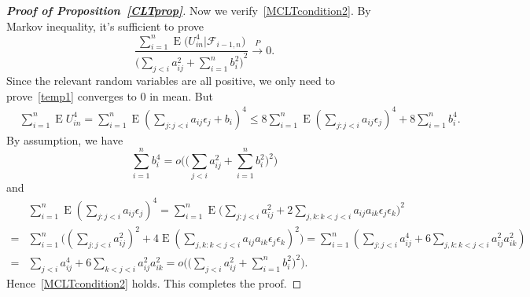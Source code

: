 \documentclass[3p]{elsarticle}
\DeclareMathOperator{\myE}{E}
\theoremstyle{plain}
\theoremstyle{definition}
\theoremstyle{remark}
\begin{document}
\begin{proof}[\textbf{Proof of Proposition~\ref{CLTprop}}]
     Now we verify~\eqref{MCLTcondition2}.
     By Markov inequality, it's sufficient to prove
     \begin{equation}\label{temp1}
         \frac{\sum_{i=1}^n \myE\big(U_{in}^4\big|\mathcal{F}_{i-1,n}\big)}{{\big(\sum_{j<i} a_{ij}^2+\sum_{i=1}^n b_i^2\big)}^2}\xrightarrow{P} 0.
     \end{equation}
     Since the relevant random variables are all positive, we only need to prove~\eqref{temp1} converges to $0$ in mean. But
     \begin{equation*}
         \begin{aligned}
             &\sum_{i=1}^n \myE U_{in}^4
             =
             \sum_{i=1}^n \myE (\sum_{j:j<i}a_{ij}\epsilon_j+b_i)^4
             \leq
             8\sum_{i=1}^n \myE (\sum_{j:j<i}a_{ij}\epsilon_j)^4
             +8\sum_{i=1}^n b_i^4.
         \end{aligned}
     \end{equation*}
     By assumption, we have
     $$
     \sum_{i=1}^n b_i^4=
             o\Big(\big(\sum_{j<i} a_{ij}^2 +\sum_{i=1}^n b_i^2\big)^2\Big)
     $$
     and
     \begin{equation*}
         \begin{aligned}
             &\sum_{i=1}^n \myE (\sum_{j:j<i}a_{ij}\epsilon_j)^4=
             \sum_{i=1}^n \myE \big(\sum_{j:j<i}a_{ij}^2+2\sum_{j,k:k<j<i}a_{ij}a_{ik}\epsilon_j \epsilon_k \big)^2\\
             =&
             \sum_{i=1}^n  \big((\sum_{j:j<i}a_{ij}^2)^2+4\myE(\sum_{j,k:k<j<i}a_{ij}a_{ik}\epsilon_j \epsilon_k)^2 \big)
             =
             \sum_{i=1}^n  (\sum_{j:j<i}a_{ij}^4+6\sum_{j,k:k<j<i}a_{ij}^2 a_{ik}^2)\\
             =&
             \sum_{j<i}a_{ij}^4+6\sum_{k<j<i}a_{ij}^2 a_{ik}^2
             =
             o\Big(\big(\sum_{j<i} a_{ij}^2 +\sum_{i=1}^n b_i^2\big)^2\Big).
         \end{aligned}
     \end{equation*}
      Hence~\eqref{MCLTcondition2} holds.
      This completes the proof.
 \end{proof}
\end{document}
